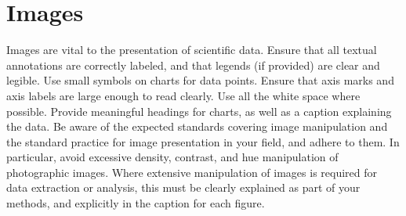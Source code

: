 \section{Images}

Images are vital to the presentation of scientific data.  Ensure that all textual annotations are correctly labeled, and that legends (if provided) are clear and legible.  Use small symbols on charts for data points.  Ensure that axis marks and axis labels are large enough to read clearly.  Use all the white space where possible.  Provide meaningful headings for charts, as well as a caption explaining the data. Be aware of the expected standards covering image manipulation and the standard practice for image presentation in your field, and adhere to them.  In particular, avoid excessive density, contrast, and hue manipulation of photographic images.  Where extensive manipulation of images is required for data extraction or analysis, this must be clearly explained as part of your methods, and explicitly in the caption for each figure.